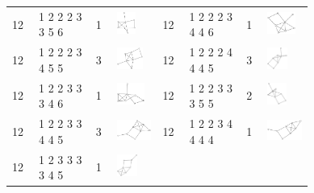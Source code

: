\begin{footnotesize}
\begin{longtable}{
        m{0.05\linewidth} m{0.15\linewidth} m{0.05\linewidth} m{0.12\linewidth} |
        m{0.05\linewidth} m{0.15\linewidth} m{0.05\linewidth} m{0.12\linewidth}
    }
12 & 1 2 2 2 3 3 5 6 & 1 & \includegraphics[height=0.7151cm]{15-universal-graphs/img/degree-sequences-example-graphs/graph-4-8-16} &
12 & 1 2 2 2 3 4 4 6 & 1 & \includegraphics[height=0.7151cm]{15-universal-graphs/img/degree-sequences-example-graphs/graph-4-8-17}\\
12 & 1 2 2 2 3 4 5 5 & 3 & \includegraphics[height=0.7151cm]{15-universal-graphs/img/degree-sequences-example-graphs/graph-4-8-18} &
12 & 1 2 2 2 4 4 4 5 & 3 & \includegraphics[height=0.7151cm]{15-universal-graphs/img/degree-sequences-example-graphs/graph-4-8-19}\\
12 & 1 2 2 3 3 3 4 6 & 1 & \includegraphics[height=0.7151cm]{15-universal-graphs/img/degree-sequences-example-graphs/graph-4-8-20} &
12 & 1 2 2 3 3 3 5 5 & 2 & \includegraphics[height=0.7151cm]{15-universal-graphs/img/degree-sequences-example-graphs/graph-4-8-21}\\
12 & 1 2 2 3 3 4 4 5 & 3 & \includegraphics[height=0.7151cm]{15-universal-graphs/img/degree-sequences-example-graphs/graph-4-8-22} &
12 & 1 2 2 3 4 4 4 4 & 1 & \includegraphics[height=0.7151cm]{15-universal-graphs/img/degree-sequences-example-graphs/graph-4-8-23}\\
12 & 1 2 3 3 3 3 4 5 & 1 & \includegraphics[height=0.7151cm]{15-universal-graphs/img/degree-sequences-example-graphs/graph-4-8-24} &

\end{longtable}
\end{footnotesize}
